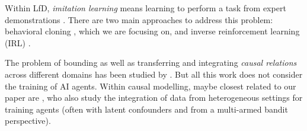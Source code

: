 \documentclass[letterpaper]{article} %
\theoremstyle{definition}%
\theoremstyle{definition}
\newcommand{\todo}[1]{\textcolor{red}{#1}}
\begin{document}
Within LfD, \emph{imitation learning} means learning to perform a task from expert demonstrations \cite{ho2016generative,muller2006off}.
There are two main approaches to address this problem: behavioral cloning \cite{pomerleau1991efficient}, which we are focusing on,
and inverse reinforcement learning (IRL) \cite{ng2000algorithms,ziebart2008maximum}. %



The problem of bounding as well as transferring and integrating \emph{causal relations} across different domains has been studied by \cite{balke1994counterfactual,bareinboim2014generalizability,magliacane2017causal}. %
But all this work does not consider the training of AI agents.
Within causal modelling, maybe closest related to our paper are \cite{bareinboim2015bandits,forney2017counterfactual,zhang2017transfer,geiger2016experimental}, who also study the integration of data from heterogeneous settings for training agents (often with latent confounders and from a multi-armed bandit perspective).
\end{document}
